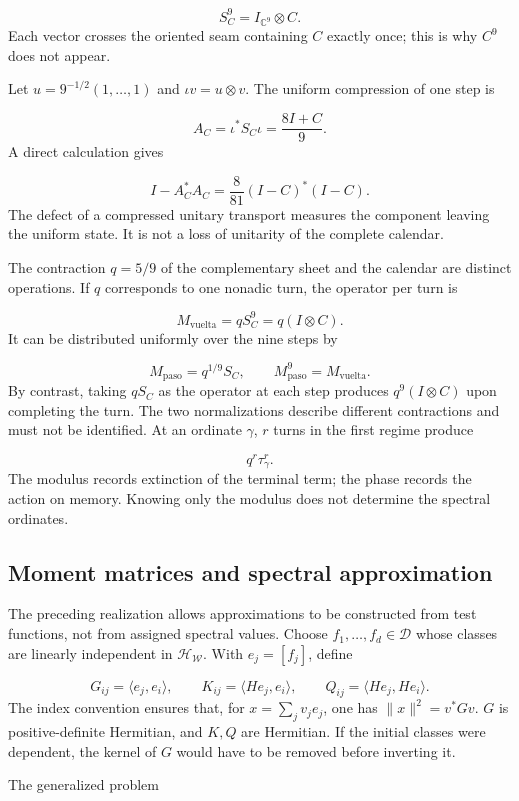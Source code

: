 \[
S_C^9=I_{\mathbb C^9}\otimes C.
\]
Each vector crosses the oriented seam containing \(C\) exactly once; this is why \(C^9\) does not appear.

Let \(u=9^{-1/2}(1,\ldots,1)\) and \(\iota v=u\otimes v\). The uniform compression of one step is

\[
A_C=\iota^*S_C\iota=\frac{8I+C}{9}.
\]
A direct calculation gives

\[
I-A_C^*A_C
=\frac8{81}(I-C)^*(I-C).
\]
The defect of a compressed unitary transport measures the component leaving the uniform state. It is not a loss of unitarity of the complete calendar.

The contraction \(q=5/9\) of the complementary sheet and the calendar are distinct operations. If \(q\) corresponds to one nonadic turn, the operator per turn is

\[
M_{\mathrm{vuelta}}=qS_C^9
=q(I\otimes C).
\]
It can be distributed uniformly over the nine steps by

\[
M_{\mathrm{paso}}=q^{1/9}S_C,\qquad
M_{\mathrm{paso}}^9=M_{\mathrm{vuelta}}.
\]
By contrast, taking \(qS_C\) as the operator at each step produces \(q^9(I\otimes C)\) upon completing the turn. The two normalizations describe different contractions and must not be identified. At an ordinate \(\gamma\), \(r\) turns in the first regime produce

\[
q^r\tau_\gamma^r.
\]
The modulus records extinction of the terminal term; the phase records the action on memory. Knowing only the modulus does not determine the spectral ordinates.

\subsection{Moment matrices and spectral approximation}
\label{rz:galerkin}
The preceding realization allows approximations to be constructed from test functions, not from assigned spectral values. Choose \(f_1,\ldots,f_d\in\mathcal D\) whose classes are linearly independent in \(\mathcal H_{\mathscr W}\). With \(e_j=[f_j]\), define

\[
G_{ij}=\langle e_j,e_i\rangle,\qquad
K_{ij}=\langle He_j,e_i\rangle,\qquad
Q_{ij}=\langle He_j,He_i\rangle.
\]
The index convention ensures that, for \(x=\sum_jv_je_j\), one has \(\|x\|^2=v^*Gv\). \(G\) is positive-definite Hermitian, and \(K,Q\) are Hermitian. If the initial classes were dependent, the kernel of \(G\) would have to be removed before inverting it.

The generalized problem

